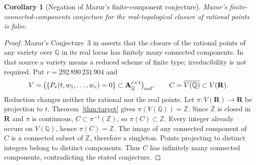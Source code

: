 \documentclass[11pt]{article}
\newtheorem{corollary}[theorem]{Corollary}
\theoremstyle{definition}
\theoremstyle{remark}
\newcommand{\Q}{\mathbb Q}
\newcommand{\Z}{\mathbb Z}
\begin{document}
\begin{corollary}[Negation of Mazur's finite-component conjecture]
\label{cor:mazur}
Mazur's
finite-connected-components conjecture for the real-topological closure
of rational points is false.
\end{corollary}
\begin{proof}
Mazur's Conjecture~3 in \cite[p.~165]{mazur1995} asserts that the closure
of the rational points of any variety over $\Q$ in its real locus has
finitely many connected components. In that source a variety means a
reduced scheme of finite type; irreducibility is not required.
Put $r=292\,890\,231\,904$ and
\[
 V=\bigl(\{P_*(t,w_1,\ldots,w_r)=0\}\subset\mathbf A^{r+1}_{\Q}\bigr)_{\rm red},
 \qquad C=\overline{V(\Q)}\subset V(\mathbf R).
\]
Reduction changes neither the rational nor the real points. Let
$\pi:V(\mathbf R)\to\mathbf R$ be projection to $t$.
Theorem~\ref{thm:target} gives $\pi(V(\Q))=\Z$. Since $\Z$ is closed in $\mathbf R$
and $\pi$ is continuous, $C\subset\pi^{-1}(\Z)$, so $\pi(C)\subset\Z$.
Every integer already occurs on $V(\Q)$, hence $\pi(C)=\Z$.
The image of any connected component of $C$ is a connected subset of
$\Z$, therefore a singleton. Points projecting to distinct integers
belong to distinct components. Thus $C$ has infinitely many connected
components, contradicting the stated conjecture.
\end{proof}
\end{document}
